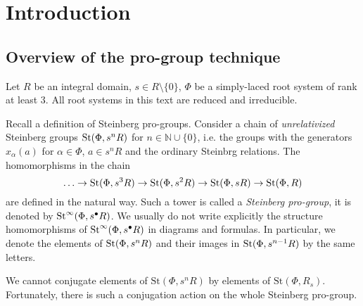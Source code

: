 \documentclass[oneside, 11pt]{amsart}
\begin{document}


\newcommand{\Set}{\mathbf{Set}}
\newcommand{\Group}{\mathbf{Grp}}
\newcommand{\Rng}{\mathbf{Rng}}
\newcommand{\Fun}{\mathbf{Fun}}
\newcommand{\Mod}{\mathbf{Mod}}
\newcommand{\op}{\mathrm{op}}
\newcommand{\ZZ}{\mathbb{Z}}

\newcommand{\otimeshat}{\mathbin{\widehat{\otimes}}}

\newcommand{\up}[2]{{^{#1}\!{#2}}}

\newcommand{\rA}{\mathsf{A}}
\newcommand{\rB}{\mathsf{B}}
\newcommand{\rC}{\mathsf{C}}
\newcommand{\rD}{\mathsf{D}}
\newcommand{\rE}{\mathsf{E}}
\newcommand{\rF}{\mathsf{F}}
\newcommand{\rG}{\mathsf{G}}

\section{Introduction}
\subsection{Overview of the pro-group technique}
Let $R$ be an integral domain, $s \in R \setminus \{0\}$, $\Phi$ be a simply-laced root system of rank at least $3$. All root systems in this text are reduced and irreducible.

Recall a definition of Steinberg pro-groups. Consider a chain of {\it unrelativized} Steinberg groups $\mathop{\mathrm{St}}\nolimits(\Phi, s^n R)$ for $n \in \mathbb N \cup \{0\}$, i.e. the groups with the generators $x_{\alpha}(a)$ for $\alpha \in \Phi$, $a \in s^n R$ and the ordinary Steinbrg relations. The homomorphisms in the chain
$$
\ldots \to \mathop{\mathrm{St}}\nolimits(\Phi, s^3 R) \to \mathop{\mathrm{St}}\nolimits(\Phi, s^2 R) \to \mathop{\mathrm{St}}\nolimits(\Phi, s R) \to \mathop{\mathrm{St}}\nolimits(\Phi, R)
$$
are defined in the natural way. Such a tower is called a {\it Steinberg pro-group}, it is denoted by $\mathop{\mathrm{St}}\nolimits^\infty(\Phi, s^\bullet R)$. We usually do not write explicitly the structure homomorphisms of $\mathop{\mathrm{St}}\nolimits^\infty(\Phi, s^\bullet R)$ in diagrams and formulas. In particular, we denote the elements of $\mathop{\mathrm{St}}\nolimits(\Phi, s^n R)$ and their images in $\mathop{\mathrm{St}}\nolimits(\Phi, s^{n - 1} R)$ by the same letters.

We cannot conjugate elements of $\mathrm{St}(\Phi, s^nR)$ by elements of $\mathrm{St}(\Phi, R_s)$. Fortunately, there is such a conjugation action on the whole Steinberg pro-group.
\end{document}
